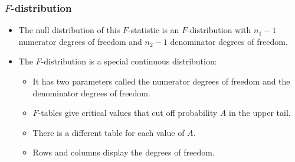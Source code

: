 \documentclass[12pt]{beamer}
\begin{document}
\begin{frame}
	\frametitle{$F$-distribution}
	
	\begin{itemize}[label={\color{blue}$\blacktriangleright$}]
		\item The null distribution of this $F$-statistic is an $F$-distribution with $n_1 - 1$ numerator degrees of freedom and $n_2 - 1$ denominator degrees of freedom.
		\item The $F$-distribution is a special continuous distribution:
		\begin{itemize}[label={\color{blue}$\blacktriangleright$}]
			\item It has two parameters called the numerator degrees of freedom and the denominator degrees of freedom.
			\item $F$-tables give critical values that cut off probability $A$ in the upper tail.
			\item There is a different table for each value of $A$.
			\item Rows and columns display the degrees of freedom.
		\end{itemize}
	\end{itemize}
	
\end{frame}
\end{document}
